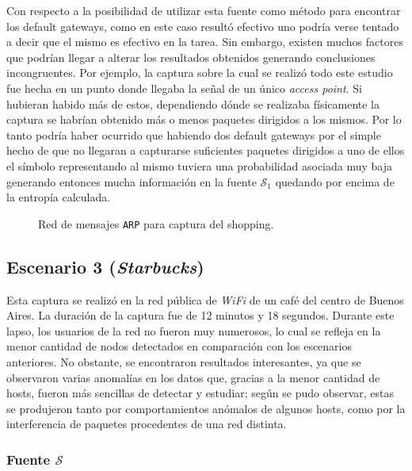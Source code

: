 Con respecto a la posibilidad de utilizar esta fuente como método para encontrar
los default gateways, como en este caso resultó efectivo uno podría verse
tentado a decir que el mismo es efectivo en la tarea. Sin embargo, existen muchos
factores que podrían llegar a alterar los resultados obtenidos generando
conclusiones incongruentes. Por ejemplo, la captura sobre la cual se realizó
todo este estudio fue hecha en un punto donde llegaba la señal de un único
\emph{access point}. Si hubieran habido más de estos, dependiendo dónde se
realizaba físicamente la captura se habrían obtenido más o menos paquetes
dirigidos a los mismos. Por lo tanto podría haber ocurrido que habiendo dos
default gateways por el simple hecho de que no llegaran a capturarse suficientes
paquetes dirigidos a uno de ellos el símbolo representando al mismo tuviera una
probabilidad asociada muy baja generando entonces mucha información en la fuente
$\mathcal{S}_1$ quedando por encima de la entropía calculada.

\begin{figure}[h!]
    \caption{Red de mensajes \texttt{ARP} para captura del shopping.}
    \label{res:esc2:fig3}
\end{figure}

\vfill %

\subsection{Escenario 3 (\emph{Starbucks})}

Esta captura se realizó en la red pública de \emph{WiFi} de un café del centro
de Buenos Aires. La duración de la captura fue de 12 minutos y 18 segundos.
Durante este lapso, los usuarios de la red no fueron muy numerosos, lo cual se
refleja en la menor cantidad de nodos detectados en comparación con los
escenarios anteriores. No obstante, se encontraron resultados interesantes, ya
que se observaron varias anomalías en los datos que, gracias a la menor
cantidad de hosts, fueron más sencillas de detectar y estudiar; según se pudo
observar, estas se produjeron tanto por comportamientos anómalos de algunos
hosts, como por la interferencia de paquetes procedentes de una red distinta.

\subsubsection{Fuente $\mathcal{S}$}

